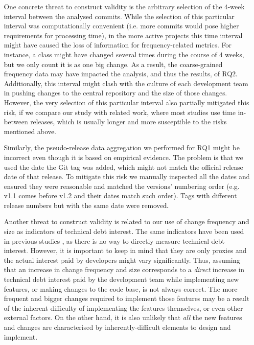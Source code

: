 One concrete threat to construct validity is the arbitrary selection of the 4-week interval between the analysed commits.
While the selection of this particular interval was computationally convenient (i.e. more commits would pose higher requirements for processing time), in the more active projects this time interval might have caused the loss of information for frequency-related metrics. For instance, a class might have changed several times during the course of 4 weeks, but we only count it is as one big change.
As a result, the coarse-grained frequency data may have impacted the analysis, and thus the results, of RQ2.
Additionally, this interval might clash with the culture of each development team in pushing changes to the central repository and the size of those changes.
However, the very selection of this particular interval also partially mitigated this risk, if we compare our study with related work, where most studies \cite{Le2015, Le2018, Khomh2012} use time in-between releases, which is usually longer and more susceptible to the risks mentioned above.

Similarly, the pseudo-release data aggregation we performed for RQ1 might be incorrect even though it is based on empirical evidence. The problem is that we used the date the Git tag was added, which might not match the official release date of that release.
To mitigate this risk we manually inspected all the dates and ensured they were reasonable and matched the versions' numbering order (e.g. v1.1 comes before v1.2 and their dates match such order).
Tags with different release numbers but with the same date were removed.

Another threat to construct validity is related to our use of change frequency and size as indicators of technical debt interest.
The same indicators have been used in previous studies \cite{Ampatzoglou2018,Nugroho2011}, as there is no way to directly measure technical debt interest. However, it is important to keep in mind that they are only proxies and the actual interest paid by developers might vary significantly.
Thus, assuming that an increase in change frequency and size corresponds to a \emph{direct} increase in technical debt interest paid by the development team while implementing new features, or making changes to the code base, is not always correct. 
The more frequent and bigger changes required to implement those features may be a result of the inherent difficulty of implementing the features themselves, or even other external factors.
On the other hand, it is also unlikely that \emph{all} the new features and changes are characterised by inherently-difficult elements to design and implement.

